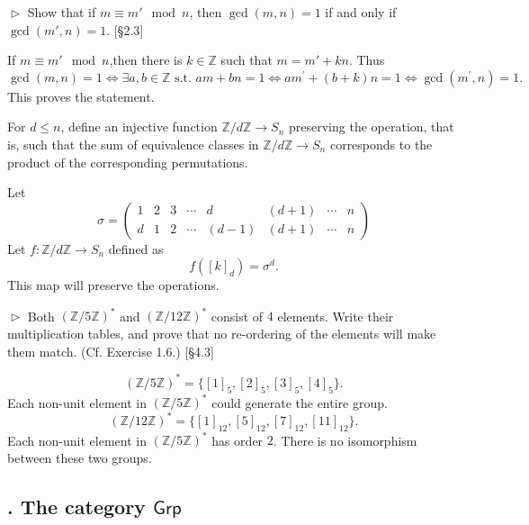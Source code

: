 \begin{problem}[2.17]
$\vartriangleright$ Show that if $m\equiv m'\mod n$, then $\gcd(m,n) = 1$ if and only if $\gcd(m',n)=1$. [\S 2.3]
\end{problem}
\begin{solution}
If $m \equiv m'\mod n$,then there is $k\in\mathbb{Z}$ such that $m=m'+kn$.
Thus
$$\gcd(m, n) = 1 \iff \exists a, b\in\mathbb{Z}\text{ s.t. } am+bn=1\iff am^{\prime}+(b+k)n =1\iff \gcd(m^{\prime},n)=1.$$
This proves the statement.
\end{solution}

\begin{problem}[2.18]
For $d \leq n$, define an injective function $\mathbb{Z}/d\mathbb{Z} \to S_n$ preserving the operation,
that is, such that the sum of equivalence classes in $\mathbb{Z}/d\mathbb{Z} \to S_n$ corresponds to the product
of the corresponding permutations.
\end{problem}
\begin{solution}
Let \[\sigma=\left(
        \begin{matrix}  
        1 & 2 & 3 & \cdots & d & (d+1) &\cdots & n\\     
    	d & 1 & 2 & \cdots & (d-1) &(d+1) &\cdots & n  
        \end{matrix}
        \right)
 \]
Let $f: \mathbb{Z}/d\mathbb{Z} \to S_n$ defined as 
$$f([k]_d) = \sigma^d.$$
This map will preserve the operations.
\end{solution}


\begin{problem}[2.19]
$\vartriangleright$ Both $(\mathbb{Z}/5\mathbb{Z})^{\ast}$ and $(\mathbb{Z}/12\mathbb{Z})^{\ast}$ consist of $4$ elements.
Write their multiplication tables, and prove that no re-ordering of the elements will make them match.
(Cf. Exercise 1.6.) [\S 4.3]
\end{problem}
\begin{solution}
$$(\mathbb{Z}/5\mathbb{Z})^{\ast} = \{[1]_5,[2]_5,[3]_5, [4]_5\}.$$ Each non-unit element in $(\mathbb{Z}/5\mathbb{Z})^{\ast}$ could generate the entire group.
$$(\mathbb{Z}/12\mathbb{Z})^{\ast} =\{[1]_{12}, [5]_{12}, [7]_{12}, [11]_{12}\}.$$ Each non-unit element in $(\mathbb{Z}/5\mathbb{Z})^{\ast}$ has order $2$. 
There is no isomorphism between these two groups.
\end{solution}


\subsection{. The category $\mathsf{Grp}$}


